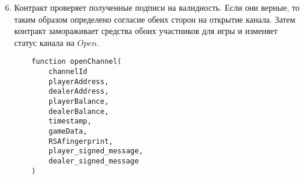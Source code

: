 \begin{algorithm}
\begin{enumerate}
\setcounter{enumi}{5}
\item Контракт проверяет полученные подписи на валидность. Если они верные, то таким образом определено согласие обеих сторон на открытие канала. Затем контракт замораживает средства обоих участников для игры и изменяет статус канала на $Open$. 
\begin{lstlisting}
    function openChannel(
        channelId
        playerAddress,
        dealerAddress,
        playerBalance,
        dealerBalance,
        timestamp,
        gameData,
        RSAfingerprint,
        player_signed_message,
        dealer_signed_message
    )
\end{lstlisting}
\end{enumerate}
\end{algorithm}




